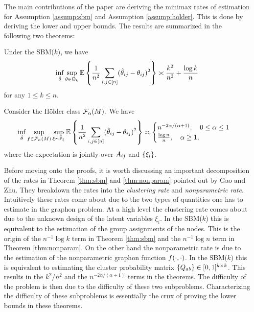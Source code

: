 \documentclass[11pt]{article}
\begin{document}
The main contributions of the paper are deriving the minimax rates of estimation for Assumption \ref{assump:sbm} and Assumption \ref{assump:holder}. This is done by deriving the lower and upper bounds. The results are summarized in the following two theorems:

\begin{theorem} \label{thm:sbm}
Under the SBM($k$), we have
\begin{equation}
\inf_{\hat{\theta}} \sup_{\theta \in \Theta_k} \mathbb{E}\left\{\frac{1}{n^2} \sum_{i,j \in \lbrack n\rbrack} (\hat{\theta}_{ij} - \theta_{ij})^2\right\} \asymp \frac{k^2}{n^2} + \frac{\log k}{n}
\end{equation}
for any $1 \leq k \leq n$.
\end{theorem}

\begin{theorem}\label{thm:nonparam}
Consider the H\"older class $\mathcal{F}_{\alpha}(M)$. We have
\begin{equation}
\inf_{\hat{\theta}} \sup_{f \in \mathcal{F}_{\alpha}(M)} \sup_{\xi \sim \mathbb{P}_{\xi}}\mathbb{E}\left\{\frac{1}{n^2} \sum_{i,j \in \lbrack n\rbrack} (\hat{\theta}_{ij} - \theta_{ij})^2\right\} \asymp
\begin{cases}
n^{-2\alpha/(\alpha + 1)}, \quad 0 \leq \alpha \leq 1 \\
\frac{\log n}{n}, \quad \alpha \geq 1,
\end{cases}
\end{equation}
where the expectation is jointly over $A_{ij}$ and $\{\xi_i\}$.
\end{theorem}

Before moving onto the proofs, it is worth discussing an important decomposition of the rates in Theorem \ref{thm:sbm} and \ref{thm:nonparam} pointed out by Gao and Zhu. They breakdown the rates into the \textit{clustering rate} and \textit{nonparametric rate}. Intuitively these rates come about due to the two types of quantities one has to estimate in the graphon problem. At a high level the clustering rate comes about due to the unknown design of the latent variables $\xi_i$. In the SBM($k$) this is equivalent to the estimation of the group assignments of the nodes. This is the origin of the $n^{-1} \log k$ term in Theorem \ref{thm:sbm} and the $n^{-1} \log n$ term in Theorem \ref{thm:nonparam}. On the other hand the nonparametric rate is due to the estimation of the nonparametric graphon function $f(\cdot, \cdot)$. In the SBM($k$) this is equivalent to estimating the cluster probability matrix $\{Q_{ab}\} \in [0, 1]^{k \times k}$. This results in the $k^2 /n^2$ and the $n^{-2\alpha/(\alpha + 1)}$ terms in the theorems. The difficulty of the problem is then due to the difficulty of these two subproblems. Characterizing the difficulty of these subproblems is essentially the crux of proving the lower bounds in these theorems.
\end{document}
